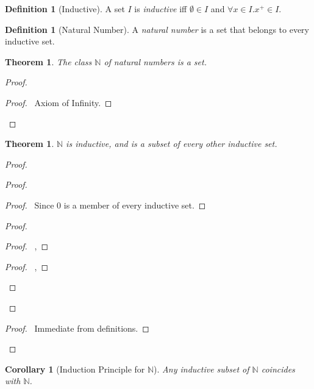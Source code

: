 \documentclass{book}
\let\qed\relax
\newtheorem{cor}{Corollary}[ax]
\newtheorem{thm}[ax]{Theorem}
\theoremstyle{definition}
\newtheorem{df}[ax]{Definition}
\begin{document}
\begin{df}[Inductive]
A set $I$ is \emph{inductive} iff $\emptyset \in I$ and $\forall x \in I. x^+ \in I$.
\end{df}

\begin{df}[Natural Number]
A \emph{natural number} is a set that belongs to every inductive set.
\end{df}

\begin{thm}
The class $\mathbb{N}$ of natural numbers is a set.
\end{thm}

\begin{proof}
\pf
{}
\begin{proof}
	\pf\ Axiom of Infinity.
\end{proof}
\qed
\end{proof}

\begin{thm}
$\mathbb{N}$ is inductive, and is a subset of every other inductive set.
\end{thm}

\begin{proof}
\pf
{}
\begin{proof}
	\begin{proof}
		\pf\ Since $0$ is a member of every inductive set.
	\end{proof}
	\begin{proof}
		\begin{proof}
			\pf\ , 
		\end{proof}
		\begin{proof}
			\pf\ , 
		\end{proof}
	\end{proof}
\end{proof}
\begin{proof}
	\pf\ Immediate from definitions.
\end{proof}
\qed
\end{proof}

\begin{cor}[Induction Principle for $\mathbb{N}$]
Any inductive subset of $\mathbb{N}$ coincides with $\mathbb{N}$.
\end{cor}
\end{document}
